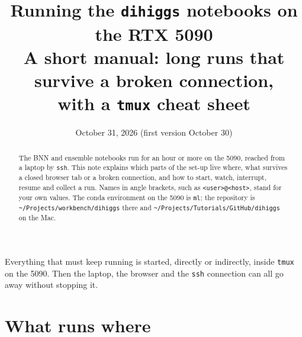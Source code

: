 \documentclass[11pt]{article}
\title{\textbf{Running the \texttt{dihiggs} notebooks on the RTX 5090}\\[4pt]
\large A short manual: long runs that survive a broken connection,\\ with a \texttt{tmux} cheat sheet}
\date{October 31, 2026 (first version October 30)}
\newcommand{\file}[1]{\nolinkurl{#1}}
\newcommand{\code}[1]{\texttt{#1}}
\begin{document}
\maketitle

\begin{abstract}
\noindent
The BNN and ensemble notebooks run for an hour or more on the 5090, reached from a laptop
by \code{ssh}. This note explains which parts of the set-up live where, what survives a
closed browser tab or a broken connection, and how to start, watch, interrupt, resume and
collect a run. Names in angle brackets, such as \code{<user>@<host>}, stand for your own
values. The conda environment on the 5090 is \code{ml}; the repository is
\file{~/Projects/workbench/dihiggs} there and \file{~/Projects/Tutorials/GitHub/dihiggs} on the Mac.
\end{abstract}

\begin{keyidea}
Everything that must keep running is started, directly or indirectly, inside \code{tmux}
on the 5090. Then the laptop, the browser and the \code{ssh} connection can all go away
without stopping it.
\end{keyidea}

\section{What runs where}
\end{document}
